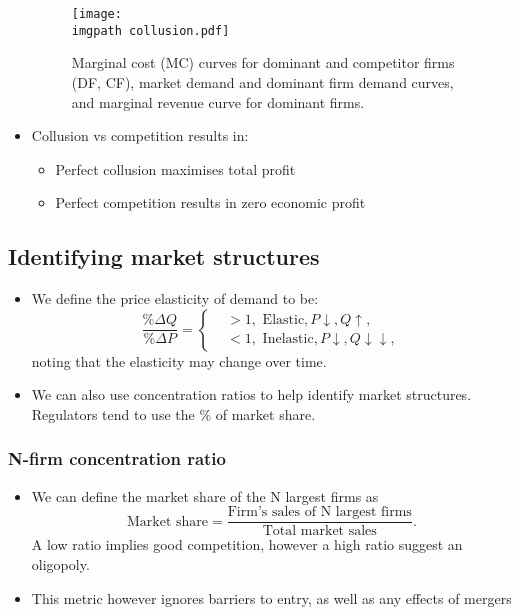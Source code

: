 \documentclass[../notes_compiled.tex]{subfiles}
\begin{document}
\begin{itemize}
\begin{figure}[h]
  \centering
  \texttt{[image: \\imgpath collusion.pdf]}
  \caption{Marginal cost (MC) curves for dominant and competitor firms (DF, CF), market demand and dominant firm demand curves, and marginal revenue curve for dominant firms.}
\end{figure}

\item Collusion vs competition results in:
\begin{itemize}
\item Perfect collusion maximises total profit
\item Perfect competition results in zero economic profit
\end{itemize}
\end{itemize}

\subsection{Identifying market structures}
\begin{itemize}
\item We define the price elasticity of demand to be:
\begin{equation}
\frac{\%\Delta Q}{\%\Delta P} = \begin{cases} &>1, \text{ Elastic}, P\downarrow, Q\uparrow, \\ & <1, \text{ Inelastic}, P\downarrow, Q\downarrow\downarrow,\end{cases}
\end{equation}
noting that the elasticity may change over time.
\item We can also use concentration ratios to help identify market structures. Regulators tend to use the \% of market share.
\end{itemize}

\subsubsection{N-firm concentration ratio}
\label{sec-nfirm}
\begin{itemize}
\item We can define the market share of the N largest firms as
\begin{equation}
\text{Market share} = \frac{\text{Firm's sales of N largest firms}}{\text{Total market sales}}. \label{nfirm}
\end{equation}
A low ratio implies good competition, however a high ratio suggest an oligopoly.
\item This metric however ignores barriers to entry, as well as any effects of mergers
\end{itemize}
\end{document}
